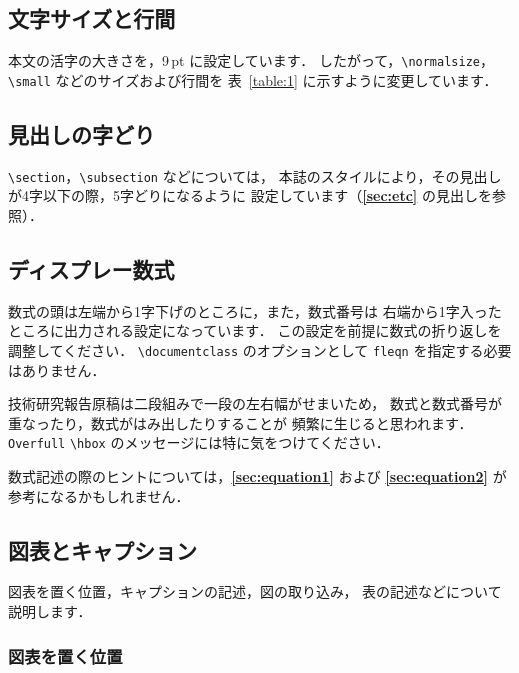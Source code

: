 \documentclass[technicalreport]{ieicej}
\begin{document}
\subsection{文字サイズと行間}

本文の活字の大きさを，9\,pt に設定しています．
したがって，\verb/\normalsize/，\verb/\small/ などのサイズおよび行間を
表~\ref{table:1} に示すように変更しています．

\subsection{見出しの字どり}

\verb/\section/，\verb/\subsection/ などについては，
本誌のスタイルにより，その見出しが4字以下の際，5字どりになるように
設定しています（{\bfseries \ref{sec:etc}} の見出しを参照）．

\subsection{ディスプレー数式}

数式の頭は左端から1字下げのところに，また，数式番号は
右端から1字入ったところに出力される設定になっています．
この設定を前提に数式の折り返しを調整してください．
\verb/\documentclass/ のオプションとして 
\texttt{fleqn} を指定する必要はありません．

技術研究報告原稿は二段組みで一段の左右幅がせまいため，
数式と数式番号が重なったり，数式がはみ出したりすることが
頻繁に生じると思われます．
\texttt{Overfull} \verb/\hbox/ のメッセージには特に気をつけてください．

数式記述の際のヒントについては，{\bfseries \ref{sec:equation1}} および
{\bfseries \ref{sec:equation2}} が参考になるかもしれません．

\subsection{図表とキャプション}

図表を置く位置，キャプションの記述，図の取り込み，
表の記述などについて説明します．

\subsubsection{図表を置く位置}
\end{document}

